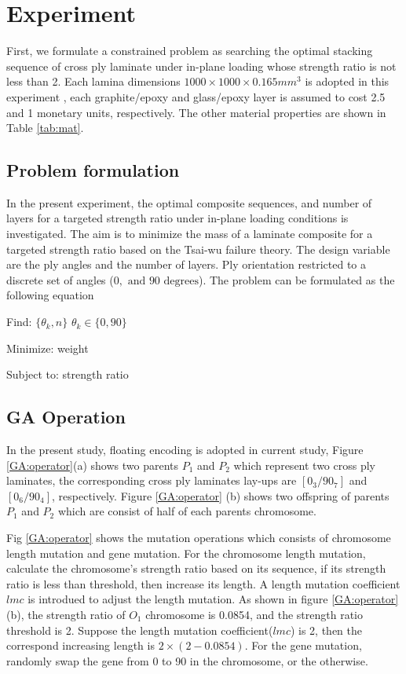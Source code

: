 \section{Experiment}
First, we formulate a constrained problem as searching the optimal stacking
sequence of cross ply laminate under in-plane loading whose strength ratio is
not less than 2.  Each lamina dimensions $1000 \times 1000 \times 0.165 mm^3$
is adopted in this experiment , each graphite/epoxy  and glass/epoxy layer is
assumed to cost 2.5 and 1 monetary units, respectively. The other material
properties are shown in Table \ref{tab:mat}. 


\subsection{Problem formulation}

In the present experiment, the optimal composite sequences, and number of
layers for a targeted strength ratio under in-plane loading conditions is
investigated.  The aim is to minimize the mass of a laminate composite for a
targeted strength ratio based on the Tsai-wu failure theory. The design
variable are the ply angles and the number of layers.  Ply orientation
restricted to a discrete set of angles ($0, \text{ and } 90 \text{ degrees} $).
The problem can be formulated as the following equation

Find: $\{\theta_k, n\}$ $\theta_k \in \{ 0,90\}$

Minimize: weight

Subject to: strength ratio


\subsection{GA Operation}


In the present study, floating encoding is adopted in current study, Figure
\ref{GA:operator}(a) shows two parents $P_1$ and $P_2$ which represent two
cross ply laminates, the corresponding cross ply laminates lay-ups are
$[0_3/90_7]$ and $[0_6/90_4]$, respectively. Figure \ref{GA:operator} (b) shows
two offspring of parents $P_1$ and $P_2$ which are consist of half of each
parents chromosome.

Fig \ref{GA:operator} shows the mutation operations which consists of
chromosome length mutation and gene mutation. For the chromosome length
mutation, calculate the chromosome's strength ratio based on its sequence, if
its strength ratio is less than threshold, then increase its length. A length
mutation coefficient $lmc$ is introdued to adjust the length mutation.  As
shown in figure \ref{GA:operator}(b), the strength ratio of $O_1$ chromosome is
0.0854, and the strength ratio threshold is 2. Suppose the length mutation
coefficient($lmc$) is 2, then the correspond increasing length is $2
\times(2-0.0854)$. For the gene mutation, randomly swap the gene from
0 to 90 in the chromosome, or the otherwise.


